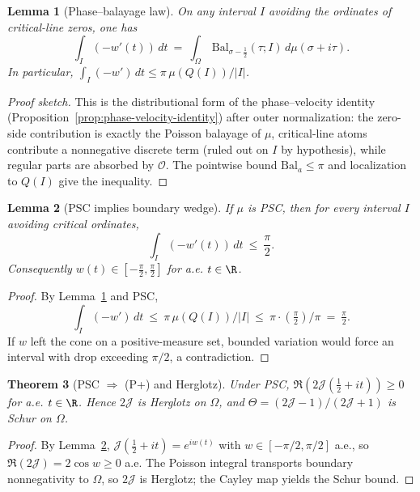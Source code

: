 \documentclass[11pt]{article}
\newtheorem{theorem}{Theorem}
\newtheorem{lemma}[theorem]{Lemma}
\theoremstyle{remark}
\begin{document}
\begin{lemma}[Phase--balayage law]\label{lem:balayage-law}
On any interval \(I\) avoiding the ordinates of critical-line zeros, one has
\[
 \int_I (-w'(t))\,dt\ =\ \int_{\Omega}\, \mathrm{Bal}_{\sigma-\frac12}(\tau;I)\, d\mu(\sigma+i\tau).
\]
In particular, \(\int_I (-w')\,dt\le \pi\, \mu(Q(I))/|I|\).
\end{lemma}
\begin{proof}[Proof sketch]
This is the distributional form of the phase--velocity identity (Proposition~\ref{prop:phase-velocity-identity}) after outer normalization: the zero-side contribution is exactly the Poisson balayage of \(\mu\), critical-line atoms contribute a nonnegative discrete term (ruled out on \(I\) by hypothesis), while regular parts are absorbed by \(\mathcal O\). The pointwise bound \(\mathrm{Bal}_a\le\pi\) and localization to \(Q(I)\) give the inequality.
\end{proof}

\begin{lemma}[PSC implies boundary wedge]\label{lem:wedge-PSC}
If \(\mu\) is PSC, then for every interval \(I\) avoiding critical ordinates,
\[\int_I (-w'(t))\,dt\ \le\ \frac{\pi}{2}.\]
Consequently \(w(t)\in[-\tfrac{\pi}{2},\tfrac{\pi}{2}]\) for a.e. \(t\in\R\).
\end{lemma}
\begin{proof}
By Lemma~\ref{lem:balayage-law} and PSC,
\[\int_I (-w')\,dt\ \le\ \pi\,\mu(Q(I))/|I|\ \le\ \pi\cdot(\tfrac{\pi}{2})/\pi\ =\ \tfrac{\pi}{2}.
\]
If \(w\) left the cone on a positive-measure set, bounded variation would force an interval with drop exceeding \(\pi/2\), a contradiction.
\end{proof}

\begin{theorem}[PSC \(\Rightarrow\) (P+) and Herglotz]\label{thm:PSC-Pplus}
Under PSC, \(\Re(2\mathcal J(\tfrac12+it))\ge 0\) for a.e. \(t\in\R\). Hence \(2\mathcal J\) is Herglotz on \(\Omega\), and \(\Theta=(2\mathcal J-1)/(2\mathcal J+1)\) is Schur on \(\Omega\).
\end{theorem}
\begin{proof}
By Lemma~\ref{lem:wedge-PSC}, \(\mathcal J(\tfrac12+it)=e^{iw(t)}\) with \(w\in[-\pi/2,\pi/2]\) a.e., so \(\Re(2\mathcal J)=2\cos w\ge 0\) a.e.
The Poisson integral transports boundary nonnegativity to \(\Omega\), so \(2\mathcal J\) is Herglotz; the Cayley map yields the Schur bound.
\end{proof}
\end{document}
